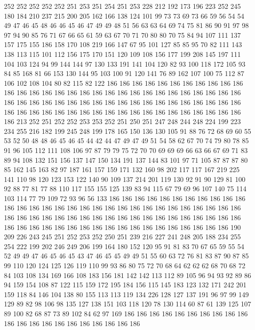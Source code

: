 252 252 252 252 252 251 253 251 254 251 253 228 212 192 173 196 223 252 245 180
184 210 237 215 200 205 162 166 138 124 101 99 73 73 69 73 66 59 56 54
54 49 47 46 45 48 46 46 45 46 47 49 49 48 51 56 63 63 64 69
74 75 81 86 90 91 97 98 97 94 90 85 76 71 67 66 65 61 59 63
67 70 71 70 80 80 70 75 84 94 107 111 137 157 175 155 186 158 170 108
219 166 147 67 95 101 127 85 85 95 70 82 111 143 138 113 115 101 112 156
175 170 151 120 109 108 156 177 199 208 145 197 111 104 103 124 94 99 144 144
97 130 133 191 141 104 120 82 93 100 118 172 105 93 84 85 168 81 66 153
130 144 95 103 100 91 120 141 76 89 162 107 100 75 112 87 106 102 108 104
80 82 115 82 122 186 186 186 186 186 186 186 186 186 186 186 186 186 186 186
186 186 186 186 186 186 186 186 186 186 186 186 186 186 186 186 186 186 186 186
186 186 186 186 186 186 186 186 186 186 186 186 186 186 186 186 186 186 186 186
186 186 186 186 186 186 186 186 186 186 186 186 186 186 213 252 251 252 252 253
253 252 251 250 251 247 248 244 248 224 199 223 234 255 216 182 199 245 248 199
178 165 150 136 130 105 91 88 76 72 68 69 60 55 53 52 50 48 48 46
45 46 45 44 42 44 47 49 47 49 51 54 58 62 67 70 74 79 80 78
85 91 96 105 112 111 108 106 97 87 79 79 75 72 70 70 69 69 69 66
63 66 67 69 71 83 89 94 108 132 151 156 137 147 150 134 191 137 144 83
101 97 71 105 87 87 87 80 85 162 145 163 82 97 187 161 157 159 171 132
160 98 202 117 117 167 219 225 141 110 98 120 123 153 122 140 90 109 137 214
201 119 130 92 91 90 129 81 100 92 88 77 81 77 88 110 117 155 155 125
139 83 94 115 67 79 69 96 107 140 75 114 103 114 77 79 109 72 93 96
56 133 186 186 186 186 186 186 186 186 186 186 186 186 186 186 186 186 186 186
186 186 186 186 186 186 186 186 186 186 186 186 186 186 186 186 186 186 186 186
186 186 186 186 186 186 186 186 186 186 186 186 186 186 186 186 186 186 186 186
186 186 186 186 186 186 186 186 186 190 209 226 243 245 251 252 253 252 250 251
239 216 227 241 248 205 188 234 255 254 222 199 202 246 249 206 199 164 180 152
120 95 91 81 83 70 67 65 59 55 54 52 49 49 47 46 45 46 45 43
47 46 45 45 49 49 51 55 60 63 72 76 81 83 87 90 87 85 99 110
120 124 125 126 119 110 99 93 86 80 75 72 70 68 64 62 62 62 68 70
68 72 84 103 108 134 169 166 108 183 156 181 142 142 113 112 89 105 96 94
93 92 89 86 94 159 154 108 87 122 115 159 172 195 184 156 115 145 183 123
132 171 242 201 159 118 84 146 104 138 80 155 113 113 119 134 226 128 127 137
191 96 97 99 149 129 89 82 98 106 98 135 127 138 151 103 118 120 78 130
114 60 87 61 139 125 107 89 100 82 68 87 73 89 102 84 62 97 169 186
186 186 186 186 186 186 186 186 186 186 186 186 186 186 186 186 186 186 186 186
